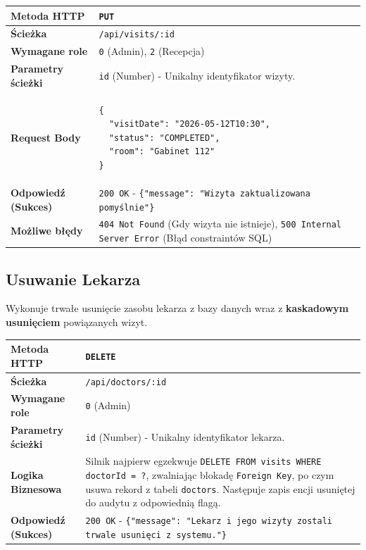 \documentclass[a4paper,12pt]{report}
\begin{document}
\noindent
\begin{tabularx}{\textwidth}{|l|X|}
\hline
\textbf{Metoda HTTP} & \texttt{PUT} \\ \hline
\textbf{Ścieżka} & \texttt{/api/visits/:id} \\ \hline
\textbf{Wymagane role} & \texttt{0} (Admin), \texttt{2} (Recepcja) \\ \hline
\textbf{Parametry ścieżki} & \texttt{id} (Number) - Unikalny identyfikator wizyty. \\ \hline
\textbf{Request Body} & 
\vspace{-4mm}
\begin{verbatim}
{
  "visitDate": "2026-05-12T10:30",
  "status": "COMPLETED",
  "room": "Gabinet 112"
}
\end{verbatim}
\vspace{-4mm}
\\ \hline
\textbf{Odpowiedź (Sukces)} & \texttt{200 OK} - \texttt{\{"message": "Wizyta zaktualizowana pomyślnie"\}} \\ \hline
\textbf{Możliwe błędy} & \texttt{404 Not Found} (Gdy wizyta nie istnieje), \texttt{500 Internal Server Error} (Błąd constraintów SQL) \\ \hline
\end{tabularx}

\vspace{1cm}

\subsection{Usuwanie Lekarza}
Wykonuje trwałe usunięcie zasobu lekarza z bazy danych wraz z \textbf{kaskadowym usunięciem} powiązanych wizyt. \\

\noindent
\begin{tabularx}{\textwidth}{|l|X|}
\hline
\textbf{Metoda HTTP} & \texttt{DELETE} \\ \hline
\textbf{Ścieżka} & \texttt{/api/doctors/:id} \\ \hline
\textbf{Wymagane role} & \texttt{0} (Admin) \\ \hline
\textbf{Parametry ścieżki} & \texttt{id} (Number) - Unikalny identyfikator lekarza. \\ \hline
\textbf{Logika Biznesowa} & Silnik najpierw egzekwuje \texttt{DELETE FROM visits WHERE doctorId = ?}, zwalniając blokadę \texttt{Foreign Key}, po czym usuwa rekord z tabeli \texttt{doctors}. Następuje zapis encji usuniętej do audytu z odpowiednią flagą. \\ \hline
\textbf{Odpowiedź (Sukces)} & \texttt{200 OK} - \texttt{\{"message": "Lekarz i jego wizyty zostali trwale usunięci z systemu."\}} \\ \hline
\end{tabularx}
\end{document}
